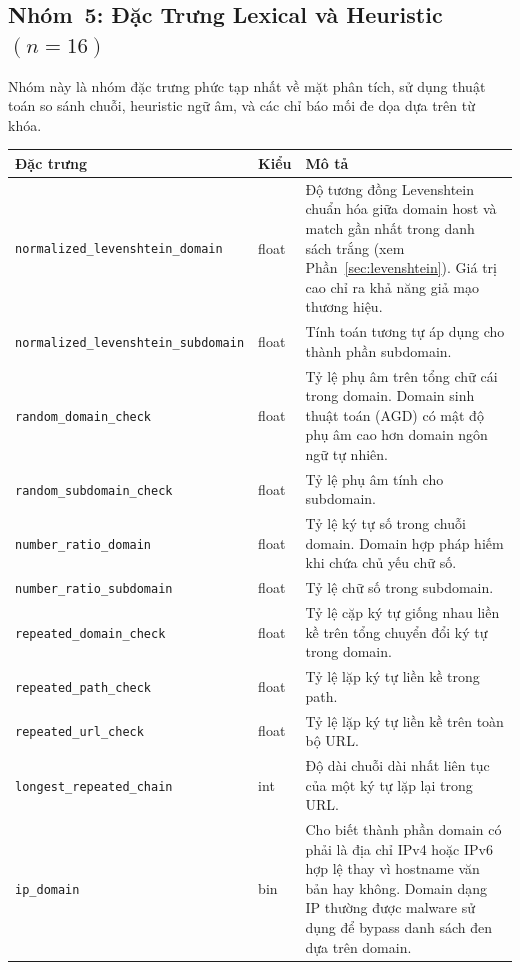 \documentclass[a4paper,12pt]{article}
\begin{document}
\subsection{Nhóm~5: Đặc Trưng Lexical và Heuristic \texorpdfstring{$(n=16)$}{(n=16)}}
\label{sec:feat_lexical}

Nhóm này là nhóm đặc trưng phức tạp nhất về mặt phân tích, sử dụng thuật toán so sánh chuỗi, heuristic ngữ âm, và các chỉ báo mối đe dọa dựa trên từ khóa.

\begin{longtable}{p{5.8cm}p{1.2cm}p{6cm}}
\toprule
\textbf{Đặc trưng} & \textbf{Kiểu} & \textbf{Mô tả} \\
\midrule
\endhead
\texttt{normalized\_levenshtein\_domain} & float &
    Độ tương đồng Levenshtein chuẩn hóa giữa domain host và match gần nhất trong danh sách trắng (xem Phần~\ref{sec:levenshtein}). Giá trị cao chỉ ra khả năng giả mạo thương hiệu. \\
\texttt{normalized\_levenshtein\_subdomain} & float &
    Tính toán tương tự áp dụng cho thành phần subdomain. \\
\texttt{random\_domain\_check} & float &
    Tỷ lệ phụ âm trên tổng chữ cái trong domain. Domain sinh thuật toán (AGD) có mật độ phụ âm cao hơn domain ngôn ngữ tự nhiên. \\
\texttt{random\_subdomain\_check} & float &
    Tỷ lệ phụ âm tính cho subdomain. \\
\texttt{number\_ratio\_domain} & float &
    Tỷ lệ ký tự số trong chuỗi domain. Domain hợp pháp hiếm khi chứa chủ yếu chữ số. \\
\texttt{number\_ratio\_subdomain} & float &
    Tỷ lệ chữ số trong subdomain. \\
\texttt{repeated\_domain\_check} & float &
    Tỷ lệ cặp ký tự giống nhau liền kề trên tổng chuyển đổi ký tự trong domain. \\
\texttt{repeated\_path\_check} & float &
    Tỷ lệ lặp ký tự liền kề trong path. \\
\texttt{repeated\_url\_check} & float &
    Tỷ lệ lặp ký tự liền kề trên toàn bộ URL. \\
\texttt{longest\_repeated\_chain} & int &
    Độ dài chuỗi dài nhất liên tục của một ký tự lặp lại trong URL. \\
\texttt{ip\_domain} & bin &
    Cho biết thành phần domain có phải là địa chỉ IPv4 hoặc IPv6 hợp lệ thay vì hostname văn bản hay không. Domain dạng IP thường được malware sử dụng để bypass danh sách đen dựa trên domain. \\

\end{longtable}
\end{document}
